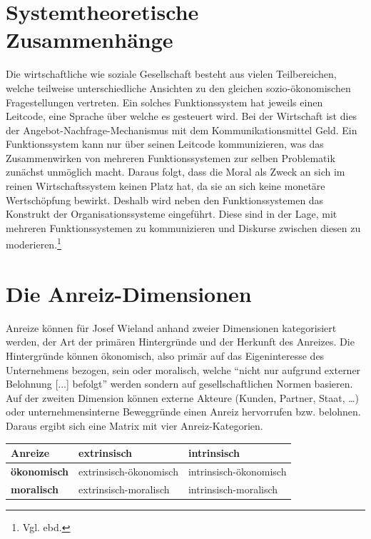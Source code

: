 \documentclass[12pt]{article}
\begin{document}
\section{Systemtheoretische Zusammenhänge}
Die wirtschaftliche wie soziale Gesellschaft besteht aus vielen Teilbereichen, welche teilweise unterschiedliche Ansichten zu den gleichen sozio-ökonomischen Fragestellungen vertreten. Ein solches Funktionssystem hat jeweils einen Leitcode, eine Sprache über welche es gesteuert wird. Bei der Wirtschaft ist dies der Angebot-Nachfrage-Mechanismus mit dem Kommunikationsmittel Geld. Ein Funktionssystem kann nur über seinen Leitcode kommunizieren, was das Zusammenwirken von mehreren Funktionssystemen zur selben Problematik zunächst unmöglich macht. Daraus folgt, dass die Moral als Zweck an sich im reinen Wirtschaftssystem keinen Platz hat, da sie an sich keine monetäre Wertschöpfung bewirkt. Deshalb wird neben den Funktionssystemen das Konstrukt der Organisationssysteme eingeführt. Diese sind in der Lage, mit mehreren Funktionssystemen zu kommunizieren und Diskurse zwischen diesen zu moderieren.\footnote{Vgl. ebd.}
\section{Die Anreiz-Dimensionen}
Anreize können für Josef Wieland anhand zweier Dimensionen kategorisiert werden, der Art der primären Hintergründe und der Herkunft des Anreizes. Die Hintergründe können ökonomisch, also primär auf das Eigeninteresse des Unternehmens bezogen, sein oder moralisch, welche “nicht nur aufgrund externer Belohnung [...] befolgt” werden sondern auf gesellschaftlichen Normen basieren. Auf der zweiten Dimension können externe Akteure (Kunden, Partner, Staat, …) oder unternehmensinterne Beweggründe einen Anreiz hervorrufen bzw. belohnen. Daraus ergibt sich eine Matrix mit vier Anreiz-Kategorien.
\begin{center}
\begin{tabular}{|p{3cm}|p{5cm}|p{5cm}|}
\hline
Anreize & \textbf{extrinsisch} & \textbf{intrinsisch}\\\hline
\textbf{ökonomisch} & extrinsisch-ökonomisch & intrinsisch-ökonomisch\\\hline
\textbf{moralisch} & extrinsisch-moralisch & intrinsisch-moralisch\\\hline
\end{tabular}
\end{center}
\end{document}

